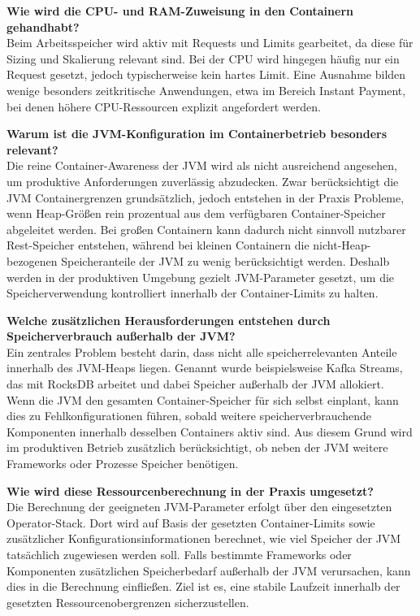 \begin{linenumbers}
	\textbf{Wie wird die CPU- und RAM-Zuweisung in den Containern gehandhabt?}\\
	Beim Arbeitsspeicher wird aktiv mit Requests und Limits gearbeitet, da diese für Sizing und Skalierung relevant sind. Bei der CPU wird hingegen häufig nur ein Request gesetzt, jedoch typischerweise kein hartes Limit. Eine Ausnahme bilden wenige besonders zeitkritische Anwendungen, etwa im Bereich Instant Payment, bei denen höhere CPU-Ressourcen explizit angefordert werden.

	\textbf{Warum ist die JVM-Konfiguration im Containerbetrieb besonders relevant?}\\
	Die reine Container-Awareness der JVM wird als nicht ausreichend angesehen, um produktive Anforderungen zuverlässig abzudecken. Zwar berücksichtigt die JVM Containergrenzen grundsätzlich, jedoch entstehen in der Praxis Probleme, wenn Heap-Größen rein prozentual aus dem verfügbaren Container-Speicher abgeleitet werden. Bei großen Containern kann dadurch nicht sinnvoll nutzbarer Rest-Speicher entstehen, während bei kleinen Containern die nicht-Heap-bezogenen Speicheranteile der JVM zu wenig berücksichtigt werden. Deshalb werden in der produktiven Umgebung gezielt JVM-Parameter gesetzt, um die Speicherverwendung kontrolliert innerhalb der Container-Limits zu halten.

	\textbf{Welche zusätzlichen Herausforderungen entstehen durch Speicherverbrauch außerhalb der JVM?}\\
	Ein zentrales Problem besteht darin, dass nicht alle speicherrelevanten Anteile innerhalb des JVM-Heaps liegen. Genannt wurde beispielsweise Kafka Streams, das mit RocksDB arbeitet und dabei Speicher außerhalb der JVM allokiert. Wenn die JVM den gesamten Container-Speicher für sich selbst einplant, kann dies zu Fehlkonfigurationen führen, sobald weitere speicherverbrauchende Komponenten innerhalb desselben Containers aktiv sind. Aus diesem Grund wird im produktiven Betrieb zusätzlich berücksichtigt, ob neben der JVM weitere Frameworks oder Prozesse Speicher benötigen.

	\textbf{Wie wird diese Ressourcenberechnung in der Praxis umgesetzt?}\\
	Die Berechnung der geeigneten JVM-Parameter erfolgt über den eingesetzten Operator-Stack. Dort wird auf Basis der gesetzten Container-Limits sowie zusätzlicher Konfigurationsinformationen berechnet, wie viel Speicher der JVM tatsächlich zugewiesen werden soll. Falls bestimmte Frameworks oder Komponenten zusätzlichen Speicherbedarf außerhalb der JVM verursachen, kann dies in die Berechnung einfließen. Ziel ist es, eine stabile Laufzeit innerhalb der gesetzten Ressourcenobergrenzen sicherzustellen.


\end{linenumbers}

